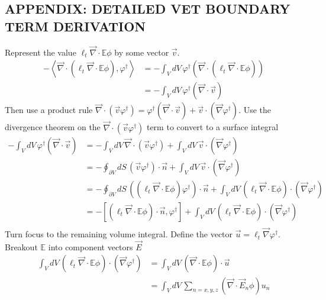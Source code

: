 \documentclass[12pt]{report}
\newcommand{\bra}{\left\langle}
\newcommand{\ket}{\right\rangle}
\newcommand{\sbra}{\left[}
\newcommand{\sket}{\right]}
\renewcommand{\div}{\vec{\nabla} \cdot}
\newcommand{\grad}{\vec{\nabla}}
\newcommand{\vefadj}{\varphi^\dag}
\newcommand{\bound}{\partial V}
\newcommand{\vn}{\vec{n}}
\newcommand{\Edd}{\mathbb{E}}
\newcommand{\isigt}{\ell_t}
\begin{document}
\begin{appendices}
\chapter{\uppercase{APPENDIX: Detailed VET Boundary Term Derivation}} \label{chap:appx2}
Represent the value $\isigt \div \Edd \phi$ by some vector $\vec{v}$. 
\begin{equation}
\begin{split}
- \bra \div \left( \isigt \div \Edd \phi \right), \vefadj \ket
&= - \int_V dV \, \vefadj  \left( \div \left( \isigt \div \Edd \phi \right) \right) \\
&= - \int_V dV \, \vefadj  \left( \div \vec{v}\right)
\end{split}
\end{equation}
Then use a product rule $\div (\vec{v} \varphi^\dag) = \varphi^\dag (\div \vec{v}) + \vec{v} \cdot (\grad \varphi^\dag)  $. Use the divergence theorem on the $\div (\vec{v} \varphi^\dag)$ term to convert to a surface integral
\begin{equation}
\begin{split}
- \int_V dV \, \vefadj  \left( \div \vec{v}\right) &= - \int_V dV \, \div (\vec{v} \varphi^\dag) + \int_V dV \, \vec{v} \cdot (\grad \varphi^\dag) \\
&= - \oint_{\bound} dS \, (\vec{v} \varphi^\dag) \cdot \vn + \int_V dV \, \vec{v} \cdot (\grad \varphi^\dag) \\
&= - \oint_{\bound} dS \, \left( \left( \isigt \div \Edd \phi \right) \varphi^\dag \right) \cdot \vn + \int_V dV \, \left( \isigt \div \Edd \phi \right) \cdot (\grad \varphi^\dag) \\
&= - \sbra \left(  \isigt \div \Edd \phi \right)  \cdot \vn , \varphi^\dag\sket + \int_V dV \, \left( \isigt \div \Edd \phi \right) \cdot (\grad \varphi^\dag) \\
\end{split}
\end{equation}
Turn focus to the remaining volume integral. Define the vector $\vec{u} = \isigt \grad \varphi^\dag$. Breakout $\Edd$ into component vectors $\vec{E}$ 
\begin{equation}
\begin{split}
\int_V dV \, \left( \isigt \div \Edd \phi \right) \cdot (\grad \varphi^\dag) 
& = \int_V dV \, \left( \div \Edd \phi \right) \cdot \vec{u} \\
& = \int_V dV \, \sum_{n=x,y,z} \left( \div \vec{E}_n \phi \right) u_{n} \\

\end{split}
\end{equation}
\end{appendices}
\end{document}
